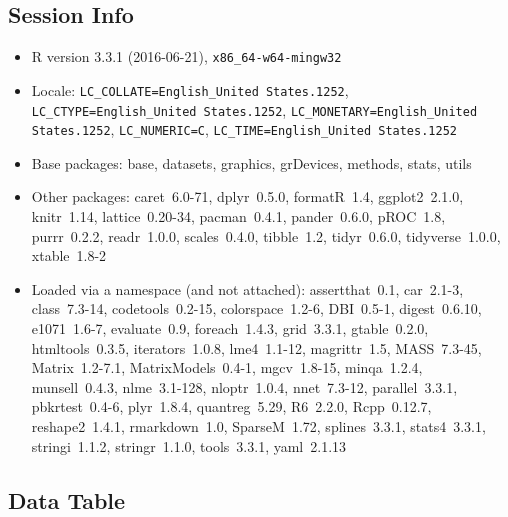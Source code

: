 \documentclass[]{article}
\begin{document}
\subsection{Session Info}\label{session-info}

\begin{itemize}\raggedright
  \item R version 3.3.1 (2016-06-21), \verb|x86_64-w64-mingw32|
  \item Locale: \verb|LC_COLLATE=English_United States.1252|, \verb|LC_CTYPE=English_United States.1252|, \verb|LC_MONETARY=English_United States.1252|, \verb|LC_NUMERIC=C|, \verb|LC_TIME=English_United States.1252|
  \item Base packages: base, datasets, graphics, grDevices,
    methods, stats, utils
  \item Other packages: caret~6.0-71, dplyr~0.5.0, formatR~1.4,
    ggplot2~2.1.0, knitr~1.14, lattice~0.20-34, pacman~0.4.1,
    pander~0.6.0, pROC~1.8, purrr~0.2.2, readr~1.0.0,
    scales~0.4.0, tibble~1.2, tidyr~0.6.0, tidyverse~1.0.0,
    xtable~1.8-2
  \item Loaded via a namespace (and not attached): assertthat~0.1,
    car~2.1-3, class~7.3-14, codetools~0.2-15, colorspace~1.2-6,
    DBI~0.5-1, digest~0.6.10, e1071~1.6-7, evaluate~0.9,
    foreach~1.4.3, grid~3.3.1, gtable~0.2.0, htmltools~0.3.5,
    iterators~1.0.8, lme4~1.1-12, magrittr~1.5, MASS~7.3-45,
    Matrix~1.2-7.1, MatrixModels~0.4-1, mgcv~1.8-15, minqa~1.2.4,
    munsell~0.4.3, nlme~3.1-128, nloptr~1.0.4, nnet~7.3-12,
    parallel~3.3.1, pbkrtest~0.4-6, plyr~1.8.4, quantreg~5.29,
    R6~2.2.0, Rcpp~0.12.7, reshape2~1.4.1, rmarkdown~1.0,
    SparseM~1.72, splines~3.3.1, stats4~3.3.1, stringi~1.1.2,
    stringr~1.1.0, tools~3.3.1, yaml~2.1.13
\end{itemize}

\subsection{Data Table}\label{data-table}
\end{document}
